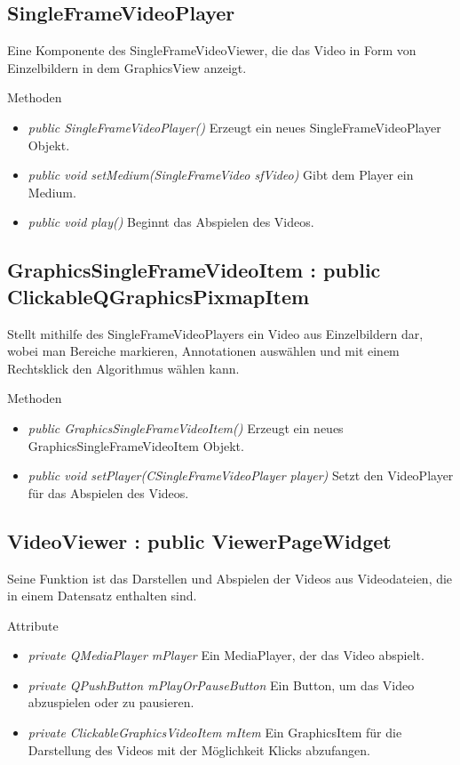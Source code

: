 \subsection*{SingleFrameVideoPlayer} 
Eine Komponente des SingleFrameVideoViewer, die das Video in Form von Einzelbildern in dem GraphicsView anzeigt.

Methoden
\begin{itemize}
	\item\textit{public SingleFrameVideoPlayer()} 
	Erzeugt ein neues SingleFrameVideoPlayer Objekt.
	\item\textit{public void setMedium(SingleFrameVideo sfVideo)} Gibt dem Player ein Medium.
	\item\textit{public void play()} Beginnt das Abspielen des Videos.
\end{itemize}

\subsection*{GraphicsSingleFrameVideoItem : public ClickableQGraphicsPixmapItem}
Stellt mithilfe des SingleFrameVideoPlayers ein Video aus Einzelbildern dar, wobei man Bereiche markieren, Annotationen auswählen und mit einem Rechtsklick den Algorithmus wählen kann.

Methoden
\begin{itemize}
	\item\textit{public GraphicsSingleFrameVideoItem()} Erzeugt ein neues GraphicsSingleFrameVideoItem Objekt.
	\item\textit{public void setPlayer(CSingleFrameVideoPlayer player)} Setzt den VideoPlayer für das Abspielen des Videos.
\end{itemize}

\subsection*{VideoViewer : public ViewerPageWidget}
Seine Funktion ist das Darstellen und Abspielen der Videos aus Videodateien, die in einem Datensatz enthalten sind.

Attribute
\begin{itemize}
	\item\textit{private QMediaPlayer mPlayer} Ein MediaPlayer, der das Video abspielt. 
	\item\textit{private QPushButton mPlayOrPauseButton} Ein Button, um das Video abzuspielen oder zu pausieren.
	\item\textit{private ClickableGraphicsVideoItem mItem} Ein GraphicsItem für die Darstellung des Videos mit der Möglichkeit Klicks abzufangen.     
\end{itemize}

